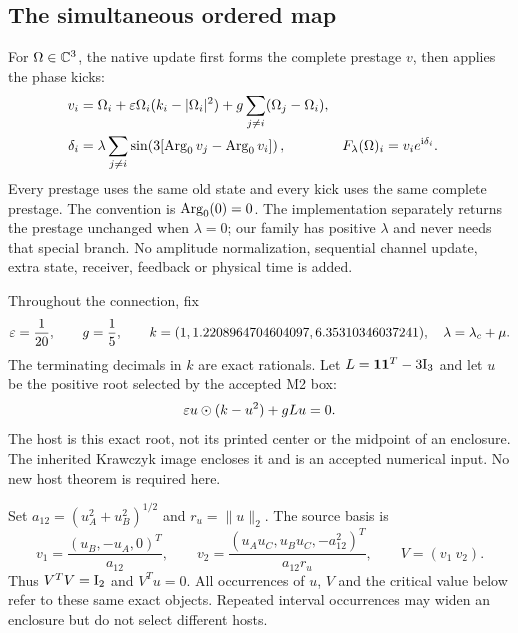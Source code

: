 \documentclass[11pt,a4paper]{article}
\numberwithin{equation}{section}
\newcommand{\iu}{\mathrm i}\newcommand{\one}{\mathbf 1}
\begin{document}
\subsection{The simultaneous ordered map}\label{sec:map}
For $\Omega\in\mathbb C^3$, the native update first forms the complete prestage $v$, then applies the phase kicks:
\begin{align}
v_i&=\Omega_i+\eps\Omega_i(k_i-|\Omega_i|^2)
       +g\sum_{j\ne i}(\Omega_j-\Omega_i),\label{eq:native-pre}\\
\delta_i&=\lambda\sum_{j\ne i}
 \sin\!\left(3[\Argz v_j-\Argz v_i]\right),
 &F_\lambda(\Omega)_i&=v_i e^{\iu\delta_i}.\label{eq:native-phase}
\end{align}
Every prestage uses the same old state and every kick uses the same complete prestage. The convention is $\operatorname{Arg}_0(0)=0$. The implementation separately returns the prestage unchanged when $\lambda=0$; our family has positive $\lambda$ and never needs that special branch. No amplitude normalization, sequential channel update, extra state, receiver, feedback or physical time is added.

Throughout the connection, fix
\begin{equation}
\varepsilon=\frac1{20},\qquad g=\frac15,\qquad
k=(1,1.2208964704604097,6.35310346037241),
\quad\lambda=\lambda_c+\mu.\label{eq:parameters}
\end{equation}
The terminating decimals in $k$ are exact rationals. Let $L=\one\one^T-3\Id_3$ and let $u$ be the positive root selected by the accepted M2 box:
\begin{equation}
\varepsilon u\odot(k-u^2)+gLu=0.\label{eq:host}
\end{equation}
The host is this exact root, not its printed center or the midpoint of an enclosure. The inherited Krawczyk image encloses it and is an accepted numerical input. No new host theorem is required here.

Set $a_{12}=(u_A^2+u_B^2)^{1/2}$ and $r_u=\|u\|_2$. The source basis is
\begin{equation}
v_1=\frac{(u_B,-u_A,0)^T}{a_{12}},\qquad
v_2=\frac{(u_Au_C,u_Bu_C,-a_{12}^2)^T}{a_{12}r_u},
\qquad V=(v_1\ v_2).\label{eq:basis}
\end{equation}
Thus $V^TV=\mathrm I_2$ and $V^Tu=0$. All occurrences of $u$, $V$ and the critical value below refer to these same exact objects. Repeated interval occurrences may widen an enclosure but do not select different hosts.
\end{document}
